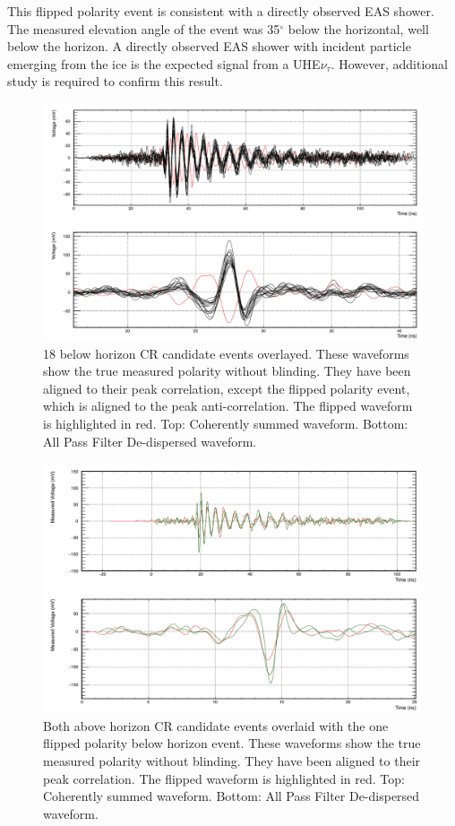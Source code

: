 	  This flipped polarity event is consistent with a directly observed EAS shower.  The measured elevation angle of the event was 35$^\circ$ below the horizontal, well below the horizon.  A directly observed EAS shower with incident particle emerging from the ice is the expected signal from a UHE$\nu_{\tau}$.  However, additional study is required to confirm this result.
	  
		\begin{figure}
			\centering
				\includegraphics[width=\textwidth]{figures/hPolOverlay_unblinded}
				\caption{18 below horizon CR candidate events overlayed.  These waveforms show the true measured polarity without blinding.  They have been aligned to their peak correlation, except the flipped polarity event, which is aligned to the peak anti-correlation.  The flipped waveform is highlighted in red.  Top: Coherently summed waveform.  Bottom: All Pass Filter De-dispersed waveform. } 
			\label{fig:hPolOverlay_unblinded}
		\end{figure}		  
		
		\begin{figure}
			\centering
				\includegraphics[width=\textwidth]{figures/directEventOverlay}
				\caption{Both above horizon CR candidate events overlaid with the one flipped polarity below horizon event.  These waveforms show the true measured polarity without blinding.  They have been aligned to their peak correlation.  The flipped waveform is highlighted in red.  Top: Coherently summed waveform.  Bottom: All Pass Filter De-dispersed waveform. } 
			\label{fig:directEventOverlay}	
		\end{figure}			
		
